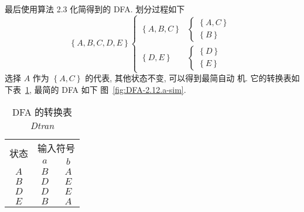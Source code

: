 \documentclass[boxes]{homework}
\begin{document}
\begin{solution}
    最后使用算法 2.3 化简得到的 DFA\@. 划分过程如下
    \begin{equation}
        \left\{ A, B, C, D, E\right\}
        \begin{cases}
            \left\{ A, B, C\right\} &
            \begin{cases}
                \left\{ A, C\right\} \\
                \left\{ B\right\}
            \end{cases}      \\
            \left\{ D, E\right\}    &
            \begin{cases}
                \left\{ D\right\} \\
                \left\{ E\right\}
            \end{cases}
        \end{cases}
    \end{equation}
    选择 $A$ 作为 $\left\{ A, C\right\}$ 的代表, 其他状态不变, 可以得到最简自动
    机. 它的转换表如下表~\ref{tab:Dtran-2.12.a-sim}, 最简的 DFA 如下
    图~\ref{fig:DFA-2.12.a-sim}.
    \begin{table}[ht]
        \centering
        \begin{tabular}{c|cc}
            \hline
            \multicolumn{1}{c|}{\multirow{2}{*}{状态}} & \multicolumn{2}{c}{输入符号}       \\ \cline{2-3}
                                                       & \multicolumn{1}{c|}{$a$}     & $b$ \\ \hline
            $A$                                        & \multicolumn{1}{c|}{$B$}     & $A$ \\ \hline
            $B$                                        & \multicolumn{1}{c|}{$D$}     & $E$ \\ \hline
            $D$                                        & \multicolumn{1}{c|}{$D$}     & $E$ \\ \hline
            $E$                                        & \multicolumn{1}{c|}{$B$}     & $A$ \\ \hline
        \end{tabular}
        \caption{DFA 的转换表 \textit{Dtran}}
        \label{tab:Dtran-2.12.a-sim}
    \end{table}
    \begin{figure}[ht]
        \centering
\end{figure}
\end{solution}
\end{document}
